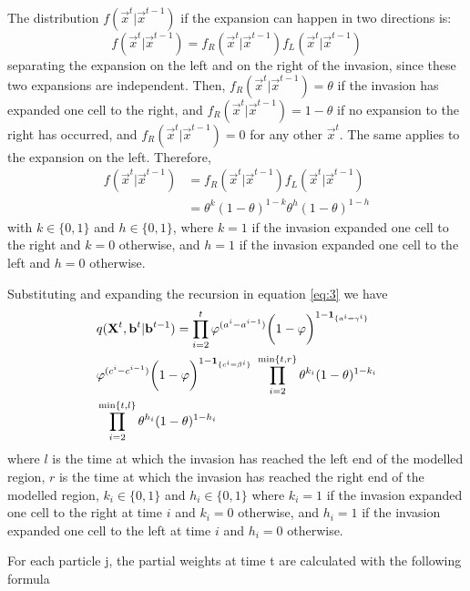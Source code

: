 The distribution $f(\vec{x}^{t} | \vec{x}^{t-1})$ if the expansion can happen in two directions is:
\begin{equation*}
    f(\vec{x}^{t} | \vec{x}^{t-1}) = f_R(\vec{x}^{t} | \vec{x}^{t-1}) f_L(\vec{x}^{t} | \vec{x}^{t-1}) 
\end{equation*}
separating the expansion on the left and on the right of the invasion, since
these two expansions are independent. Then, $f_R(\vec{x}^{t} | \vec{x}^{t-1}) = \theta$ if the invasion has expanded one cell to the right, and $f_R(\vec{x}^{t} | \vec{x}^{t-1}) = 1 - \theta$ if no expansion to the right has occurred, and $f_R(\vec{x}^{t} | \vec{x}^{t-1}) = 0$ for any other $\vec{x}^{t}$. The same applies to the expansion on the left. Therefore,
\begin{align*}
    f(\vec{x}^{t} | \vec{x}^{t-1}) &= f_R(\vec{x}^{t} | \vec{x}^{t-1}) f_L(\vec{x}^{t} | \vec{x}^{t-1})\\
    & = \theta^{k} (1-\theta)^{1-k}\theta^{h} (1-\theta)^{1-h} 
\end{align*}
with $k \in \{0,1\}$ and $h \in \{0,1\}$, where $k = 1$ if the invasion expanded one cell to the right and $k = 0$ otherwise, and $h = 1$ if the invasion expanded one cell to the left and $h = 0$ otherwise.

Substituting and expanding the recursion in equation \eqref{eq:3} we have
\begin{align}
    & q(\mathbf{X}^{t},\mathbf{b}^{t} | \mathbf{b}^{t-1}) =  \prod_{i=2}^{t} \varphi^{(a^{i} - a^{i-1})}\bigg(1 - \varphi \bigg)^{1-\mathbf{1}_{\{a^i=\gamma^i\}}} \nonumber \\
    & \varphi^{(c^{i} - c^{i-1})} \bigg(1 - \varphi\bigg)^{1-\mathbf{1}_{\{c^i=\beta^i\}}} \; \prod_{i=2}^{\min\{t,r\}} \theta^{k_i} (1-\theta)^{1-k_i}  \label{eq:4} \\ 
    & \prod_{i=2}^{\min\{t,l\}} \theta^{h_i} (1-\theta)^{1-h_i} \nonumber
\end{align}
where $l$ is the time at which the invasion has reached the left end of the modelled region, $r$ is the time at which the invasion has reached the right end of the modelled region, $k_i \in \{0,1\}$ and $h_i \in \{0,1\}$ where $k_i = 1$  if the invasion expanded one cell to the right at time $i$ and $k_i = 0$ otherwise, and $h_i = 1$ if the invasion expanded one cell to the left at time $i$ and $h_i = 0$ otherwise.







For each particle j, the partial weights at time t are calculated with the following formula

